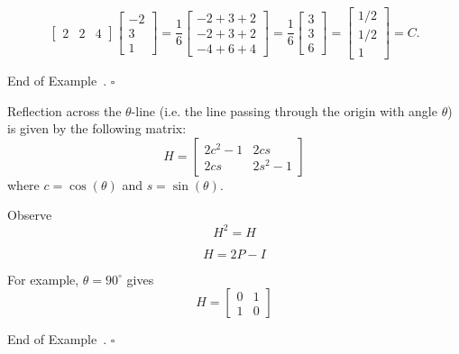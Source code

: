 \documentclass[10pt]{article}
\theoremstyle{definition}
\newtheorem{example}[theorem]{Example}
\renewenvironment{example}
{\begin{oldexample}}
  {\par\smallskip\hfill   End of Example~\theexample. $\square$    \par\end{oldexample}}
\begin{document}
\begin{example}[Projections]
\begin{equation*}
\begin{bmatrix}
      2&2&4
    \end{bmatrix}
    \begin{bmatrix}
      -2\\3\\1
    \end{bmatrix}
    =
    \frac{1}{6}
    \begin{bmatrix}
      -2+3+2\\
      -2+3+2\\
      -4+6+4
    \end{bmatrix}
    = \frac{1}{6}
    \begin{bmatrix}
      3\\
      3\\
      6
    \end{bmatrix}
    =
    \begin{bmatrix}
      1/2\\1/2\\1
    \end{bmatrix}
    =C.
  \end{equation*}
\end{example}

\begin{example}[Reflection]
  Reflection across the $\theta$-line (i.e. the line passing through the
  origin with angle $\theta$) is given by the following matrix:
  \begin{equation*}
    H =
    \begin{bmatrix}
      2c^{2}-1&2cs\\
      2cs&2s^{2}-1
    \end{bmatrix}
  \end{equation*}
  where $c=\cos(\theta)$ and $s=\sin(\theta)$.

  Observe
  \begin{equation*}
    H^{2}=H
  \end{equation*}

  \begin{equation*}
    H = 2P-I
  \end{equation*}

  For example, $\theta=90^{\circ}$ gives
  \begin{equation*}
    H =
    \begin{bmatrix}
      0&1\\
      1&0
    \end{bmatrix}
  \end{equation*}
\end{example}
\end{document}
